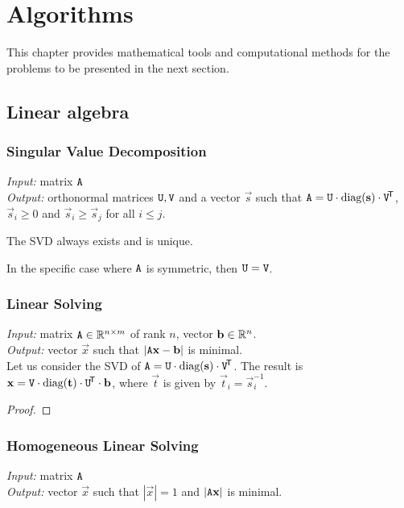 \chapter{Algorithms}

This chapter provides mathematical tools and computational methods for the problems to be presented in the next section.

\section{Linear algebra}

\subsection{Singular Value Decomposition}
\textit{Input:} matrix $\mathtt{A}$\\
\textit{Output:} orthonormal matrices $\mathtt{U}, \mathtt{V}$ and a vector $\vec s$ such that $\mathtt{A} = \mathtt{U} \cdot \textrm{diag}(\mathbf{s}) \cdot \mathtt{V}^{\!\mathsf{T}}$, $\vec s_i \geq 0$ and $\vec s_i \geq \vec s_j$ for all $i \leq j$.\\


The SVD always exists and is unique.

In the specific case where $\mathtt{A}$ is symmetric, then $\mathtt{U} = \mathtt{V}$.

\subsection{Linear Solving}
\textit{Input:} matrix $\mathtt{A} \in \mathbb{R}^{n \times m}$ of rank $n$, vector $\mathbf{b} \in \mathbb{R}^n$.\\
\textit{Output:} vector $\vec x$ such that $|\mathtt{A} \mathbf{x} - \mathbf{b}|$ is minimal.\\

Let us consider the SVD of $\mathtt{A} = \mathtt{U} \cdot \textrm{diag}(\mathbf{s}) \cdot \mathtt{V}^{\!\mathsf{T}}$.
The result is $\mathbf{x} = \mathtt{V} \cdot \textrm{diag}(\mathbf{t}) \cdot \mathtt{U}^{\!\mathsf{T}} \cdot \mathbf{b}$, where $\vec t$ is given by $\vec t_i = \vec s_i ^{-1}$.

\begin{proof}
\todo{\dots}
\end{proof}

\subsection{Homogeneous Linear Solving}
\textit{Input:} matrix $\mathtt{A}$\\
\textit{Output:} vector $\vec x$ such that $|\vec x| = 1$ and $|\mathtt{A} \mathbf{x}|$ is minimal.\\

